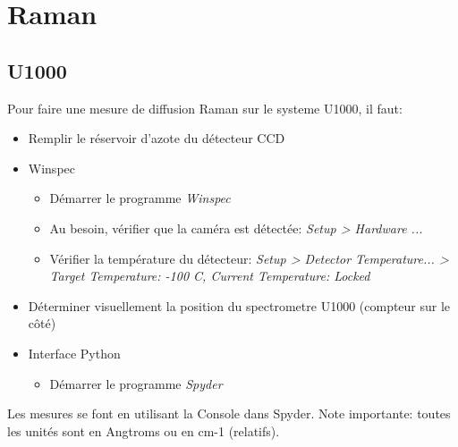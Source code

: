 \documentclass[11pt,francais]{book} %
\begin{document}
\newpage
\section{Raman}

\subsection{U1000}

Pour faire une mesure de diffusion Raman sur le systeme U1000, il faut:
\begin{itemize}
\item Remplir le réservoir d'azote du détecteur CCD
\item Winspec
	\begin{itemize}
	\item Démarrer le programme \it{Winspec}
	\item Au besoin, vérifier que la caméra est détectée: \it{Setup > Hardware ...}
	\item Vérifier la température du détecteur: \it{Setup > Detector Temperature...} > Target Temperature: -100 C, Current Temperature: Locked
	\end{itemize}
\item Déterminer visuellement la position du spectrometre U1000 (compteur sur le côté)
\item Interface Python
	\begin{itemize}
	\item Démarrer le programme \it{Spyder}
	\end{itemize}
\end{itemize}

Les mesures se font en utilisant la Console dans Spyder.
Note importante: toutes les unités sont en Angtroms ou en cm-1 (relatifs).
\end{document}
